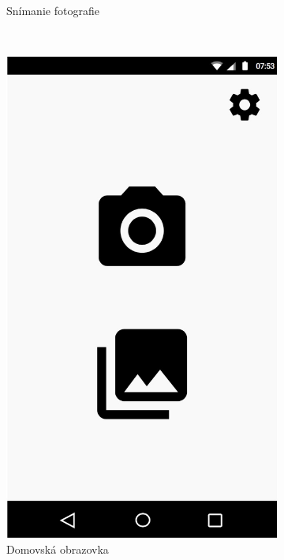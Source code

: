 \begin{figure}[h!]
\begin{subfigure}{0.3\textwidth}
      \caption{Snímanie fotografie}
      \label{fig:sketch_capture}
  \end{subfigure}
  ~
  \begin{subfigure}{0.3\textwidth}
      \includegraphics[width=\textwidth]{figures/ui/sketches/sketch-home}
      \caption{Domovská obrazovka}
      \label{fig:sketch_home}
  \end{subfigure}
  ~
  \begin{subfigure}{0.3\textwidth}

\end{subfigure}
\end{figure}
